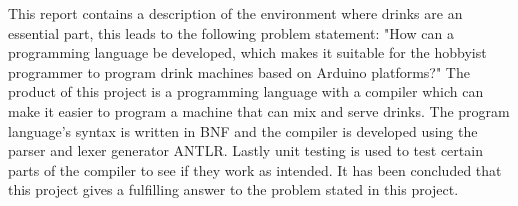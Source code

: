 This report contains a description of the environment where drinks are an essential part, this leads to the following problem statement:
"How can a programming language be developed, which makes it suitable for the hobbyist programmer to program drink machines based on Arduino platforms?"
The product of this project is a programming language with a compiler which can make it easier to program a machine that can mix and serve drinks. The program language's syntax is written in BNF and the compiler is developed using the parser and lexer generator ANTLR. Lastly unit testing is used to test certain parts of the compiler to see if they work as intended. It has been concluded that this project gives a fulfilling answer to the problem stated in this project.